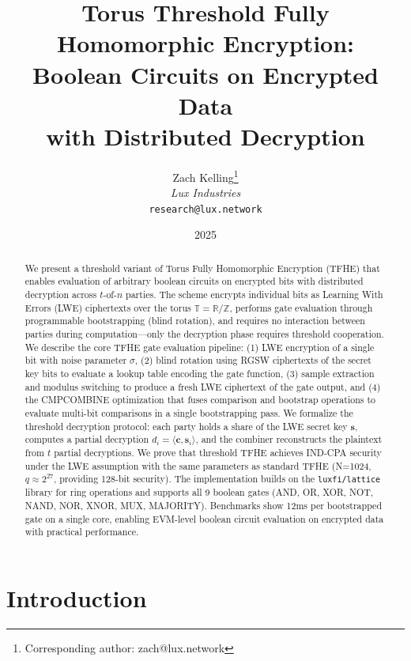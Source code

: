 \documentclass[11pt,a4paper]{article}
\title{\textbf{Torus Threshold Fully Homomorphic Encryption:\\Boolean Circuits on Encrypted Data\\with Distributed Decryption}}
\author{
Zach Kelling\thanks{Corresponding author: zach@lux.network}\\
\textit{Lux Industries}\\
\texttt{research@lux.network}
}
\date{2025}
\begin{document}
\luxcoverpage
\maketitle

\begin{abstract}
We present a threshold variant of Torus Fully Homomorphic Encryption (TFHE) that enables
evaluation of arbitrary boolean circuits on encrypted bits with distributed decryption
across $t$-of-$n$ parties. The scheme encrypts individual bits as Learning With Errors
(LWE) ciphertexts over the torus $\mathbb{T} = \mathbb{R}/\mathbb{Z}$, performs gate
evaluation through programmable bootstrapping (blind rotation), and requires no interaction
between parties during computation---only the decryption phase requires threshold
cooperation.
We describe the core TFHE gate evaluation pipeline: (1) LWE encryption of a single bit
with noise parameter $\sigma$, (2) blind rotation using RGSW ciphertexts of the secret
key bits to evaluate a lookup table encoding the gate function, (3) sample extraction
and modulus switching to produce a fresh LWE ciphertext of the gate output, and
(4) the CMPCOMBINE optimization that fuses comparison and bootstrap operations to evaluate
multi-bit comparisons in a single bootstrapping pass.
We formalize the threshold decryption protocol: each party holds a share of the LWE
secret key $\mathbf{s}$, computes a partial decryption $d_i = \langle \mathbf{c}, \mathbf{s}_i \rangle$,
and the combiner reconstructs the plaintext from $t$ partial decryptions. We prove that
threshold TFHE achieves IND-CPA security under the LWE assumption with the same parameters
as standard TFHE (N=1024, $q \approx 2^{27}$, providing 128-bit security).
The implementation builds on the \texttt{luxfi/lattice} library for ring operations
and supports all 9 boolean gates (AND, OR, XOR, NOT, NAND, NOR, XNOR, MUX, MAJORITY).
Benchmarks show 12ms per bootstrapped gate on a single core, enabling EVM-level boolean
circuit evaluation on encrypted data with practical performance.
\end{abstract}

\tableofcontents
\newpage

\section{Introduction}
\label{sec:introduction}
\end{document}

